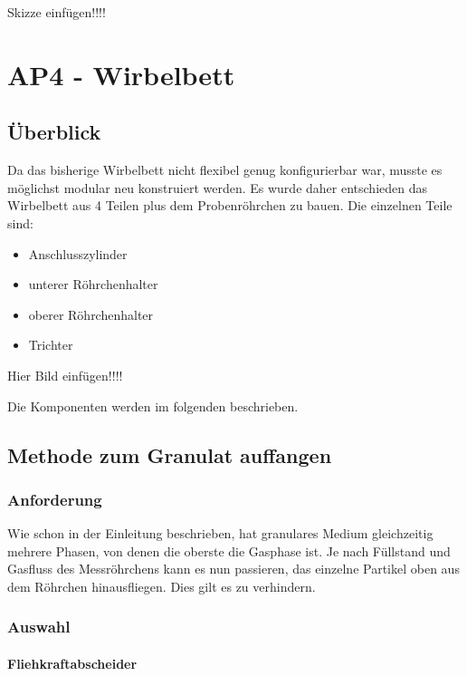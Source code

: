 Skizze einfügen!!!!



\section{AP4 - Wirbelbett}


\subsection{Überblick}

Da das bisherige Wirbelbett nicht flexibel genug konfigurierbar war, musste es möglichst modular neu konstruiert werden. Es wurde daher entschieden das Wirbelbett aus 4 Teilen plus dem Probenröhrchen zu bauen. Die einzelnen Teile sind:

\begin{itemize}
	\item Anschlusszylinder
	\item unterer Röhrchenhalter
	\item oberer Röhrchenhalter
	\item Trichter
\end{itemize}


Hier Bild einfügen!!!!


Die Komponenten werden im folgenden beschrieben.


\subsection{Methode zum Granulat auffangen}

\subsubsection{Anforderung}

Wie schon in der Einleitung beschrieben, hat granulares Medium gleichzeitig mehrere Phasen, von denen die oberste die Gasphase ist. Je nach Füllstand und Gasfluss des Messröhrchens kann es nun passieren, das einzelne Partikel oben aus dem Röhrchen hinausfliegen. Dies gilt es zu verhindern.

\subsubsection{Auswahl}

\paragraph{Fliehkraftabscheider} 

